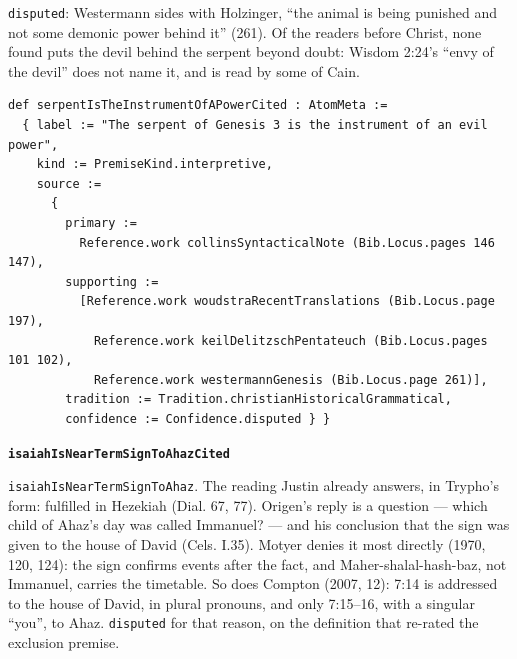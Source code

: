 \documentclass[11pt]{article}
\begin{document}
\texttt{disputed}: Westermann sides with Holzinger, “the animal is being punished and not some demonic power behind it” (261). Of the readers before Christ, none found puts the devil behind the serpent beyond doubt: Wisdom 2:24’s “envy of the devil” does not name it, and is read by some of Cain.

{\small\begin{verbatim}
def serpentIsTheInstrumentOfAPowerCited : AtomMeta :=
  { label := "The serpent of Genesis 3 is the instrument of an evil power",
    kind := PremiseKind.interpretive,
    source :=
      {
        primary :=
          Reference.work collinsSyntacticalNote (Bib.Locus.pages 146 147),
        supporting :=
          [Reference.work woudstraRecentTranslations (Bib.Locus.page 197),
            Reference.work keilDelitzschPentateuch (Bib.Locus.pages 101 102),
            Reference.work westermannGenesis (Bib.Locus.page 261)],
        tradition := Tradition.christianHistoricalGrammatical,
        confidence := Confidence.disputed } }
\end{verbatim}}
\par\medskip\noindent\textbf{\texttt{isaiah\allowbreak{}Is\allowbreak{}Near\allowbreak{}Term\allowbreak{}Sign\allowbreak{}To\allowbreak{}Ahaz\allowbreak{}Cited}}\par\nobreak\noindent
\texttt{isaiah\allowbreak{}Is\allowbreak{}Near\allowbreak{}Term\allowbreak{}Sign\allowbreak{}To\allowbreak{}Ahaz}. The reading Justin already answers, in Trypho’s form: fulfilled in Hezekiah (Dial. 67, 77). Origen’s reply is a question — which child of Ahaz’s day was called Immanuel? — and his conclusion that the sign was given to the house of David (Cels. I.35). Motyer denies it most directly (1970, 120, 124): the sign confirms events after the fact, and Maher-shalal-hash-baz, not Immanuel, carries the timetable. So does Compton (2007, 12): 7:14 is addressed to the house of David, in plural pronouns, and only 7:15–16, with a singular “you”, to Ahaz. \texttt{disputed} for that reason, on the definition that re-rated the exclusion premise.
\end{document}
